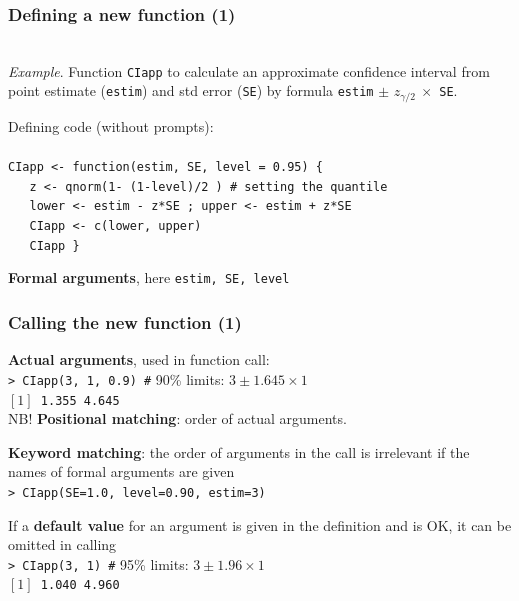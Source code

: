 \documentclass[handout,12pt]{beamer}
\begin{document}
\begin{frame}\frametitle{Defining a new function (1)}
\ \\
{\it Example}. Function {\tt CIapp} to calculate an approximate confidence interval
 from point estimate ({\tt estim}) 
and std error ({\tt SE}) by formula {\tt estim} $\pm$ $z_{\gamma/2}\ \times$ {\tt SE}. 

\medskip
Defining code (without prompts): \\
\ \\
{\tt CIapp <- function(estim, SE, level = 0.95) \{ \\
 \ \ \ z <- qnorm(1- (1-level)/2 )  \# setting the quantile\\
 \ \ \ lower <- estim - z*SE ; upper <- estim + z*SE  \\
 \ \ \ CIapp <- c(lower, upper)   \\
 \ \ \ CIapp \} 
}
\bi
\item {\bf Formal arguments}, here {\tt estim, SE, level}
\ei
\end{frame} 
\begin{frame}\frametitle{Calling the new function (1)}
\bi
\item {\bf Actual arguments}, used in function call: \\
{\tt > CIapp(3, 1, 0.9) \#} 90\% limits: $3 \pm 1.645\times 1$ \\
{\tt $[1]$ 1.355  4.645 }\\
\medskip
    NB! {\bf Positional matching}: order of actual arguments.
    \medskip
\item {\bf Keyword matching}: the order of arguments in the call is 
    irrelevant if the names of formal arguments are  given \\
	{\tt > CIapp(SE=1.0, level=0.90, estim=3)  }
	\medskip
\item If a {\bf default value} for an argument is given in the definition and is OK, it can be omitted in calling \\
{\tt > CIapp(3, 1) \#} 95\% limits: $3 \pm 1.96 \times 1$  \\
{\tt $[1]$ 1.040  4.960 }
\ei
\end{frame} 


\end{document}
